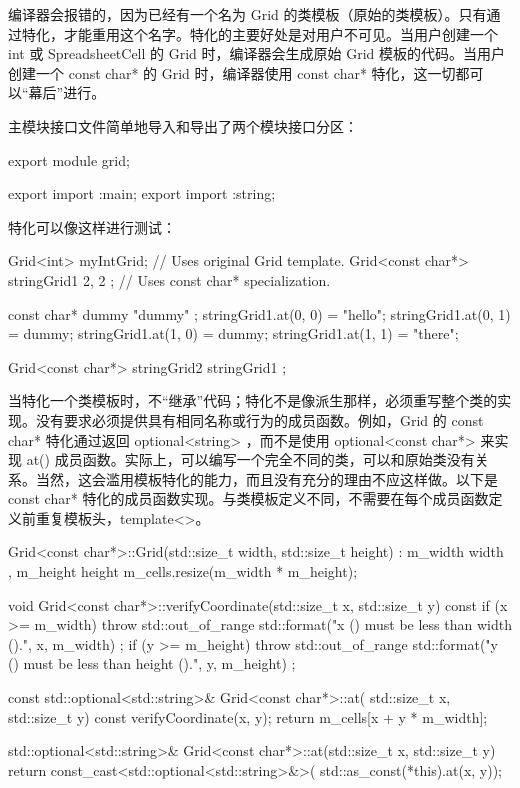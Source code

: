 编译器会报错的，因为已经有一个名为 Grid 的类模板（原始的类模板）。只有通过特化，才能重用这个名字。特化的主要好处是对用户不可见。当用户创建一个 int 或 SpreadsheetCell 的 Grid 时，编译器会生成原始 Grid 模板的代码。当用户创建一个 const char* 的 Grid 时，编译器使用 const char* 特化，这一切都可以“幕后”进行。

主模块接口文件简单地导入和导出了两个模块接口分区：

\begin{cpp}
export module grid;

export import :main;
export import :string;
\end{cpp}

特化可以像这样进行测试：

\begin{cpp}
Grid<int> myIntGrid; // Uses original Grid template.
Grid<const char*> stringGrid1 { 2, 2 }; // Uses const char* specialization.

const char* dummy { "dummy" };
stringGrid1.at(0, 0) = "hello";
stringGrid1.at(0, 1) = dummy;
stringGrid1.at(1, 0) = dummy;
stringGrid1.at(1, 1) = "there";

Grid<const char*> stringGrid2 { stringGrid1 };
\end{cpp}

当特化一个类模板时，不“继承”代码；特化不是像派生那样，必须重写整个类的实现。没有要求必须提供具有相同名称或行为的成员函数。例如，Grid 的 const char* 特化通过返回 optional<string> ，而不是使用 optional<const char*> 来实现 at() 成员函数。实际上，可以编写一个完全不同的类，可以和原始类没有关系。当然，这会滥用模板特化的能力，而且没有充分的理由不应这样做。以下是 const char* 特化的成员函数实现。与类模板定义不同，不需要在每个成员函数定义前重复模板头，template<>。

\begin{cpp}
Grid<const char*>::Grid(std::size_t width, std::size_t height)
: m_width { width }, m_height { height }
{
    m_cells.resize(m_width * m_height);
}

void Grid<const char*>::verifyCoordinate(std::size_t x, std::size_t y) const
{
    if (x >= m_width) {
        throw std::out_of_range {
            std::format("x ({}) must be less than width ({}).", x, m_width) };
    }
    if (y >= m_height) {
        throw std::out_of_range {
            std::format("y ({}) must be less than height ({}).", y, m_height) };
    }
}

const std::optional<std::string>& Grid<const char*>::at(
std::size_t x, std::size_t y) const
{
    verifyCoordinate(x, y);
    return m_cells[x + y * m_width];
}

std::optional<std::string>& Grid<const char*>::at(std::size_t x, std::size_t y)
{
    return const_cast<std::optional<std::string>&>(
    std::as_const(*this).at(x, y));
}
\end{cpp}

